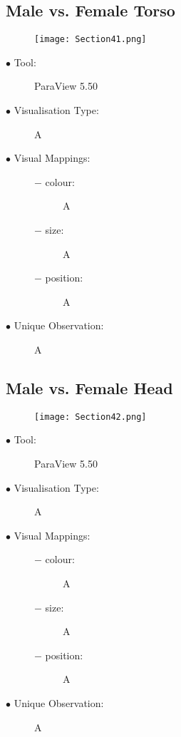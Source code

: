 \documentclass{article}
\begin{document}
\subsection{Male vs. Female Torso}
\begin{figure}[h]
	\centering
	\texttt{[image: Section41.png]}
\end{figure}
\begin{description}
	\item[$\bullet$ Tool:] ParaView 5.50
	\item[$\bullet$ Visualisation Type:] A
	\item[$\bullet$ Visual Mappings:] \hfill
		\begin{description}
			\item[$-$ colour:] A
			\item[$-$ size:] A
			\item[$-$ position:] A
		\end{description}
	\item[$\bullet$ Unique Observation:] A
\end{description}
\newpage

\subsection{Male vs. Female Head}
\begin{figure}[h]
	\centering
	\texttt{[image: Section42.png]}
\end{figure}
\begin{description}
	\item[$\bullet$ Tool:] ParaView 5.50
	\item[$\bullet$ Visualisation Type:] A
	\item[$\bullet$ Visual Mappings:] \hfill
		\begin{description}
			\item[$-$ colour:] A
			\item[$-$ size:] A
			\item[$-$ position:] A
		\end{description}
	\item[$\bullet$ Unique Observation:] A
\end{description}
\newpage
\end{document}
